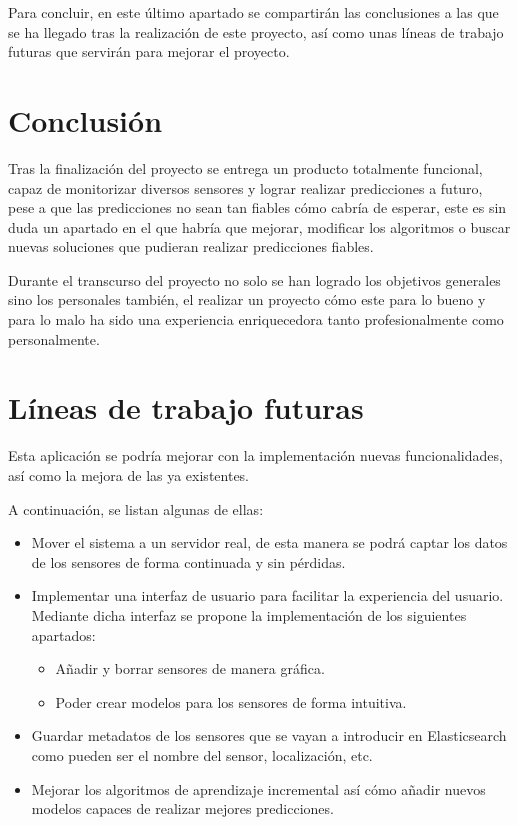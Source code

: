 
Para concluir, en este último apartado se compartirán las conclusiones a las que se ha llegado tras la realización de este proyecto, así como unas líneas de trabajo futuras que servirán para mejorar el proyecto.

\section{Conclusión}

Tras la finalización del proyecto se entrega un producto totalmente funcional, capaz de monitorizar diversos sensores y lograr realizar predicciones a futuro, pese a que las predicciones no sean tan fiables cómo cabría de esperar, este es sin duda un apartado en el que habría que mejorar, modificar los algoritmos o buscar nuevas soluciones que pudieran realizar predicciones fiables.

Durante el transcurso del proyecto no solo se han logrado los objetivos generales sino los personales también, el realizar un proyecto cómo este para lo bueno y para lo malo ha sido una experiencia enriquecedora tanto profesionalmente como personalmente.


\section{Líneas de trabajo futuras}
Esta aplicación se podría mejorar con la implementación nuevas funcionalidades, así como la mejora de las ya existentes.

A continuación, se listan algunas de ellas:
\begin{itemize}
    \item Mover el sistema a un servidor real, de esta manera se podrá captar los datos de los sensores de forma continuada y sin pérdidas.
    \item Implementar una interfaz de usuario para facilitar la experiencia del usuario. Mediante dicha interfaz se propone la implementación de los siguientes apartados:
    \begin{itemize}
        \item Añadir y borrar sensores de manera gráfica.
        \item Poder crear modelos para los sensores de forma intuitiva.
    \end{itemize}
    \item Guardar metadatos de los sensores que se vayan a introducir en Elasticsearch como pueden ser el nombre del sensor, localización, etc. 
    \item Mejorar los algoritmos de aprendizaje incremental así cómo añadir nuevos modelos capaces de realizar mejores predicciones.
\end{itemize}